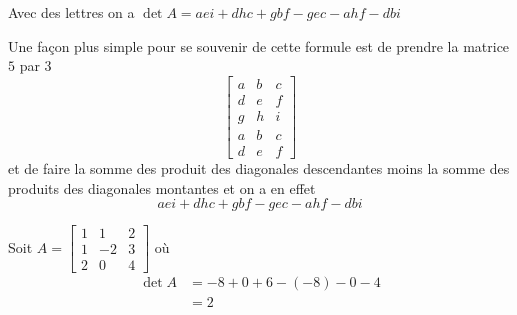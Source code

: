 \documentclass[11pt,colorlinks]{book}
\theoremstyle{mytheoremstyle}
\theoremstyle{mytheoremstyle}
\theoremstyle{mytheoremstyle}
\theoremstyle{mytheoremstyle}
\theoremstyle{mytheoremstyle}
\theoremstyle{mytheoremstyle}
\theoremstyle{mytheoremstyle}
\theoremstyle{mytheoremstyle}
\theoremstyle{myproblemstyle}
\begin{document}
\begin{rmq}
  Avec des lettres on a $\det A = aei + dhc + gbf - gec - ahf - dbi$
\end{rmq}
\begin{theorem}
  Une façon plus simple pour se souvenir de cette formule est de prendre la matrice $5$ par $3$ 
  \begin{equation*}
    \begin{bmatrix}
      a & b & c \\ 
      d & e & f \\ 
      g & h & i \\ 
      a & b & c \\ 
      d & e & f
    \end{bmatrix}
  \end{equation*}
  et de faire la somme des produit des diagonales descendantes moins la somme des produits des diagonales montantes et on a en effet 
  \begin{equation*}
    aei + dhc + gbf - gec - ahf - dbi
  \end{equation*}
\end{theorem}
\begin{ex}
  Soit $A = \begin{bmatrix}
    1 & 1 & 2 \\ 
    1 & -2 & 3 \\ 
    2 & 0 & 4
  \end{bmatrix}$
  où
  \begin{align*}
    \det A &= -8 + 0 + 6 - (-8) - 0 - 4 \\ 
    &= 2
  \end{align*}
\end{ex}
\end{document}
